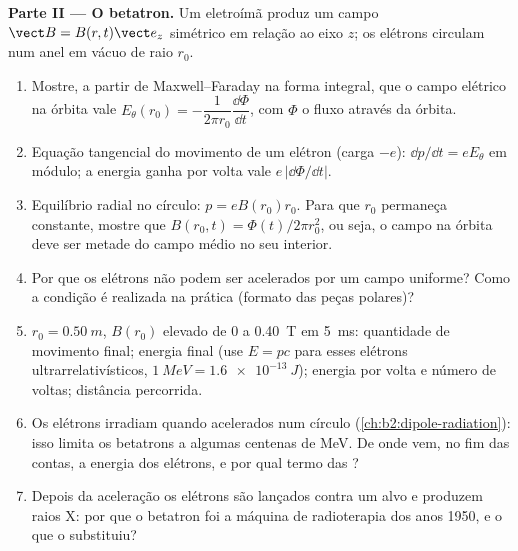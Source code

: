 \begin{problem}
\medskip
\noindent\textbf{Parte II --- O betatron.}
Um eletroímã produz um campo $\vect B = B(r, t)\vect e_z$ simétrico
em relação ao eixo $z$; os elétrons circulam num anel em vácuo de raio $r_0$.
\begin{enumerate}[resume]
  \item Mostre, a partir de Maxwell--Faraday na forma integral, que o
        campo elétrico na órbita vale $E_\theta(r_0) = -\dfrac1{2\pi r_0}
        \dfrac{\dd\Phi}{\dd t}$, com $\Phi$ o fluxo através da órbita.
  \item Equação tangencial do movimento de um elétron (carga $-e$):
        $\dd p/\dd t = eE_\theta$ em módulo; a energia ganha por volta vale
        $e\,|\dd\Phi/\dd t|$.
  \item Equilíbrio radial no círculo: $p = eB(r_0)r_0$. Para que $r_0$
        permaneça constante, mostre que $B(r_0, t) = \Phi(t)/2\pi r_0^2$, ou seja, o
        campo na órbita deve ser metade do campo médio no seu interior.
  \item Por que os elétrons não podem ser acelerados por um campo uniforme?
        Como a condição é realizada na prática (formato das peças
        polares)?
  \item $r_0 = \qty{0.50}{m}$, $B(r_0)$ elevado de $0$ a \qty{0.40}{T} em
        \qty{5}{ms}: quantidade de movimento final; energia final (use $E = pc$ para esses
        elétrons ultrarrelativísticos, $\qty{1}{MeV} = \qty{1.6e-13}{J}$);
        energia por volta e número de voltas; distância percorrida.
  \item Os elétrons irradiam quando acelerados num círculo
        (\cref{ch:b2:dipole-radiation}): isso limita os betatrons a algumas
        centenas de MeV. De onde vem, no fim das contas, a energia dos elétrons,
        e por qual termo das ?
  \item Depois da aceleração os elétrons são lançados contra um alvo e
        produzem raios X: por que o betatron foi a máquina de radioterapia
        dos anos 1950, e o que o substituiu?
\end{enumerate}


\end{problem}
